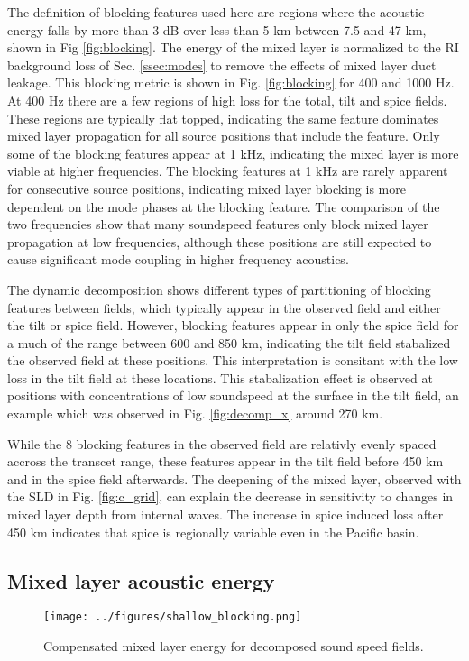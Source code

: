 \documentclass[preprint,NumberedRefs]{JASA}
\begin{document}
The definition of blocking features used here are regions where the acoustic energy falls by more than 3 dB over less than 5 km between 7.5 and 47 km, shown in Fig \ref{fig:blocking}. The energy of the mixed layer is normalized to the RI background loss of Sec. \ref{ssec:modes} to remove the effects of mixed layer duct leakage. This blocking metric is shown in Fig. \ref{fig:blocking} for 400 and 1000 Hz. At 400 Hz there are a few regions of high loss for the total, tilt and spice fields. These regions are typically flat topped, indicating the same feature dominates mixed layer propagation for all source positions that include the feature. Only some of the blocking features appear at 1 kHz, indicating the mixed layer is more viable at higher frequencies. The blocking features at 1 kHz are rarely apparent for consecutive source positions, indicating mixed layer blocking is more dependent on the mode phases at the blocking feature. The comparison of the two frequencies show that many soundspeed features only block mixed layer propagation at low frequencies, although these positions are still expected to cause significant mode coupling in higher frequency acoustics.

The dynamic decomposition shows different types of partitioning of blocking features between fields, which typically appear in the observed field and either the tilt or spice field. However, blocking features appear in only the spice field for a much of the range between 600 and 850 km, indicating the tilt field stabalized the observed field at these positions. This interpretation is consitant with the low loss in the tilt field at these locations. This stabalization effect is observed at positions with concentrations of low soundspeed at the surface in the tilt field, an example which was observed in Fig. \ref{fig:decomp_x} around 270 km.

While the 8 blocking features in the observed field are relativly evenly spaced accross the transcet range, these features appear in the tilt field before 450 km and in the spice field afterwards. The deepening of the mixed layer, observed with the SLD in Fig. \ref{fig:c_grid}, can explain the decrease in sensitivity to changes in mixed layer depth from internal waves. The increase in spice induced loss after 450 km indicates that spice is regionally variable even in the Pacific basin.

\subsection{Mixed layer acoustic energy}
\begin{figure}
\texttt{[image: ../figures/shallow\_blocking.png]}
    \caption{Compensated mixed layer energy for decomposed sound speed fields.}
    \label{fig:shal_block}
\end{figure}
\end{document}
